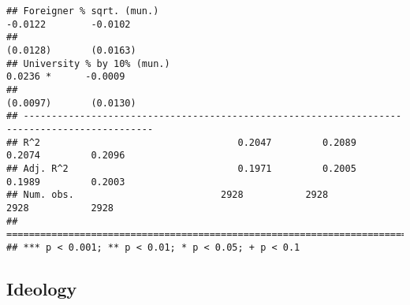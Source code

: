 \documentclass[
]{article}
\begin{document}
\begin{verbatim}
## Foreigner % sqrt. (mun.)                                           -0.0122        -0.0102    
##                                                                    (0.0128)       (0.0163)   
## University % by 10% (mun.)                                          0.0236 *      -0.0009    
##                                                                    (0.0097)       (0.0130)   
## ---------------------------------------------------------------------------------------------
## R^2                                   0.2047         0.2089         0.2074         0.2096    
## Adj. R^2                              0.1971         0.2005         0.1989         0.2003    
## Num. obs.                          2928           2928           2928           2928         
## =============================================================================================
## *** p < 0.001; ** p < 0.01; * p < 0.05; + p < 0.1
\end{verbatim}

\hypertarget{ideology-3}{%
\subsection{Ideology}\label{ideology-3}}
\end{document}
